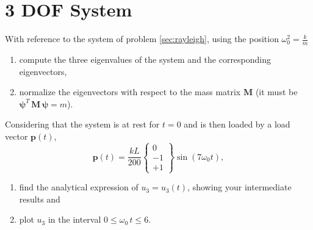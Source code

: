 \documentclass[11pt,a4paper]{article}
\begin{document}
\section{3 DOF System}
With reference to the system of problem \ref{sec:rayleigh}, using the
position \(\omega_0^2=\displaystyle\frac km\)
\begin{enumerate}
\item compute the three eigenvalues of the system and the
  corresponding eigenvectors,
\item normalize the eigenvectors with respect to the mass matrix $\bm
  M$ (it must be $\bm\psi^T\,\bm M\,\bm\psi = m$).
\end{enumerate}
Considering that the system is at rest for $t=0$ and is then loaded by
a load vector \(\bm p(t)\),
\[\bm p(t) = \frac{kL}{200}
\begin{Bmatrix}
  0\\-1\\+1
\end{Bmatrix}
  \sin(7\omega_0 t),
\]
\begin{enumerate}[resume]
\item find the analytical expression of $u_3=u_3(t)$, showing your
  intermediate results and
\item plot $u_3$ in the interval $0 \le \omega_0\,t \le 6$.
\end{enumerate}
\end{document}
